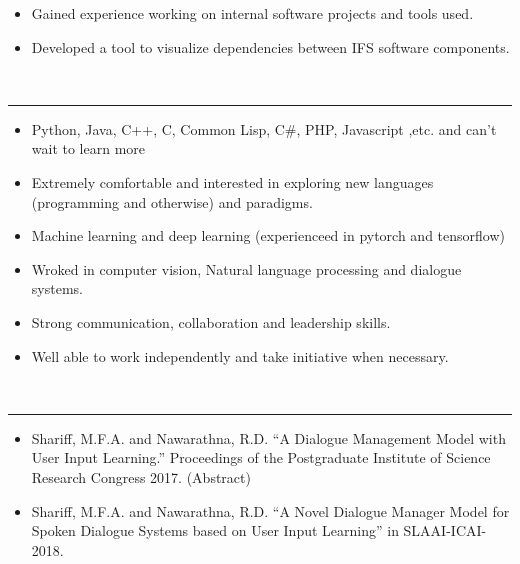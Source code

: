 \documentclass[a4paper,11pt]{article}
\begin{document}
\vspace{-15pt}
\begin{itemize}
  \setlength\itemsep{-3pt}
\item Gained experience working on internal software projects and tools used.
\item Developed a tool to visualize dependencies between IFS software components.
\end{itemize}

\vspace{18pt}
\noindent\textbf{\color{MidnightBlue}\large{}}
\vspace{-8pt}\noindent\\\rule{0.75\textwidth}{0.4pt}
\vspace{-5pt}
\begin{itemize}
  \setlength\itemsep{-3pt}
\item Python, Java, C++, C, Common Lisp, C\#, PHP, Javascript ,etc. and can't wait to learn more
\item Extremely comfortable and interested in exploring new languages (programming and otherwise) and paradigms.
\item Machine learning and deep learning (experienceed in pytorch and tensorflow)
\item Wroked in computer vision,  Natural language processing and dialogue systems.
\item Strong communication, collaboration and leadership skills.
\item Well able to work independently and take initiative when necessary.
\end{itemize}

\vspace{18pt}
\noindent\textbf{\color{MidnightBlue}\large{}}
\vspace{-8pt}\noindent\\\rule{0.75\textwidth}{0.4pt}
\begin{itemize}
\item[]Shariff, M.F.A. and Nawarathna, R.D. ``A Dialogue Management Model with User Input Learning.'' Proceedings of the Postgraduate Institute of Science Research Congress 2017. (Abstract)
\item[]Shariff, M.F.A. and Nawarathna, R.D. ``A Novel Dialogue Manager Model for Spoken Dialogue Systems based on User Input Learning'' in SLAAI-ICAI-2018.
\end{itemize}
\pagebreak[4]
\end{document}
